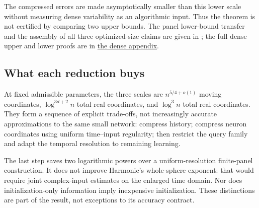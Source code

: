 The compressed errors are made asymptotically smaller than this lower
scale without measuring dense variability as an algorithmic input. Thus the theorem is
not certified by comparing two upper bounds. The panel lower-bound
transfer and the assembly of all three optimized-size claims are given
in ; the full dense upper and lower
proofs are in \hyperref[int:dense-proofs]{the dense appendix}.

\subsection{What each reduction buys}
\label{sec:size}

At fixed admissible parameters, the three scales are
$n^{5/4+o(1)}$ moving coordinates, $\log^{3d+2}n$ total real coordinates,
and $\log^3n$ total real coordinates. They form a sequence of explicit
trade-offs, not increasingly accurate approximations to the same small
network: compress history; compress neuron coordinates using uniform
time--input regularity; then restrict the query family and adapt the
temporal resolution to remaining learning.

The last step saves two logarithmic powers over a uniform-resolution
finite-panel construction. It does not improve Harmonic's whole-sphere
exponent: that would require joint complex-input estimates on the enlarged
time domain. Nor does initialization-only information imply inexpensive
initialization. These distinctions are part of the result, not exceptions
to its accuracy contract.
